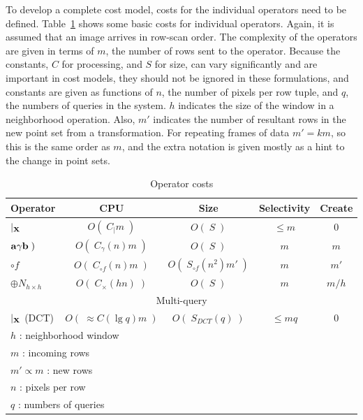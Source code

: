 \documentclass{ucdthesis}       %
\begin{document}
To develop a complete cost model, costs for the individual operators
need to be defined.  Table~\ref{tab:operator-cost} shows some basic
costs for individual operators.  Again, it is assumed that an image
arrives in row-scan order.  The complexity of the operators are given
in terms of $m$, the number of rows sent to the operator.  Because the
constants, $C$ for processing, and $S$ for size, can vary
significantly and are important in cost models, they should not
be ignored in these formulations, and constants are given as functions
of $n$, the number of pixels per row tuple, and $q$, the numbers of
queries in the system.  $h$ indicates the size of the window in a
neighborhood operation.  Also, $m'$ indicates the number of resultant
rows in the new point set from a transformation. For repeating frames
of data $m'=km$, so this is the same order as $m$, and the extra
notation is given mostly as a hint to the change in point sets.
%
\begin{table}[htb]
  \caption{Operator costs}
  \centering
  \begin{tabular}{l|c|c|c|c}
    Operator & CPU & Size & Selectivity & Create \\
    \hline \hline
    $|_{\bf{X}}$ & $O(\;C_{|}m\;)$ & $O(\;S\;)$ & $\le m$ & 0 \\ 
    ${\bf{a}}\gamma{\ensuremath{\bf{b}}}\;)$ & $O(\;C_{\gamma}(n)m\;)$ & $O(\;S\;)$ & $m$ & $m$ \\
    $\circ f$ & $O(\;C_{\circ f}(n)m\;)$ & $O(\;S_{\circ f}(n^2)m'\;)$  & $m$ & $m'$ \\    
    $\oplus N_{h \times h}$ & $O(\;C_{\times}(hn)\;)$ & $O(\;S\;)$ & $m$ & $m/h$ \\
    \hline
    \multicolumn{5}{c}{Multi-query} \\
    \hline \hline
    $|_{\bf{X}}$ (DCT) & $O(\;\approx C(\lg{q})m\;)$ & $O(\;S_{DCT}(q)\;)$ & $\le mq$ & 0 \\ 
    \hline
    \multicolumn{5}{l}{$h$ : neighborhood window} \\
    \multicolumn{5}{l}{$m$ : incoming rows} \\
    \multicolumn{5}{l}{$m' \propto m$ : new rows} \\
    \multicolumn{5}{l}{$n$ : pixels per row} \\
    \multicolumn{5}{l}{$q$ : numbers of queries}
  \end{tabular}

\label{tab:operator-cost}
\end{table}
\end{document}
